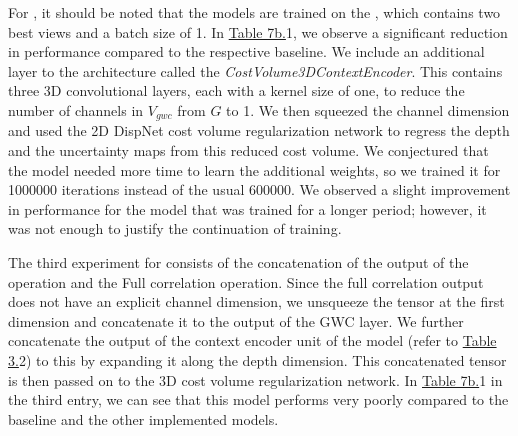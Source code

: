 For {\rmvd}, it should be noted that the models are trained on the {\bms}, which contains two best views and a batch size of 1. In \hyperref[tab:corr-layer]{Table 7b.}{1}, we observe a significant reduction in performance compared to the respective baseline. We include an additional layer to the architecture called the \textit{CostVolume3DContextEncoder}. This contains three 3D convolutional layers, each with a kernel size of one, to reduce the number of channels in \(V_{gwc}\) from \(G\) to 1. We then squeezed the channel dimension and used the 2D DispNet cost volume regularization network to regress the depth and the uncertainty maps from this reduced cost volume. We conjectured that the model needed more time to learn the additional weights, so we trained it for 1000000 iterations instead of the usual 600000. We observed a slight improvement in performance for the model that was trained for a longer period; however, it was not enough to justify the continuation of training. \par

The third experiment for {\rmvd} consists of the concatenation of the output of the {\gwc} operation and the Full correlation operation. Since the full correlation output does not have an explicit channel dimension, we unsqueeze the tensor at the first dimension and concatenate it to the output of the GWC layer. We further concatenate the output of the context encoder unit of the {\rmvd} model (refer to \hyperref[tab:arch-rmvd]{Table 3.}{2}) to this by expanding it along the depth dimension. This concatenated tensor is then passed on to the 3D cost volume regularization network. In \hyperref[tab:corr-layer]{Table 7b.}{1} in the third entry, we can see that this model performs very poorly compared to the baseline and the other implemented models. 
